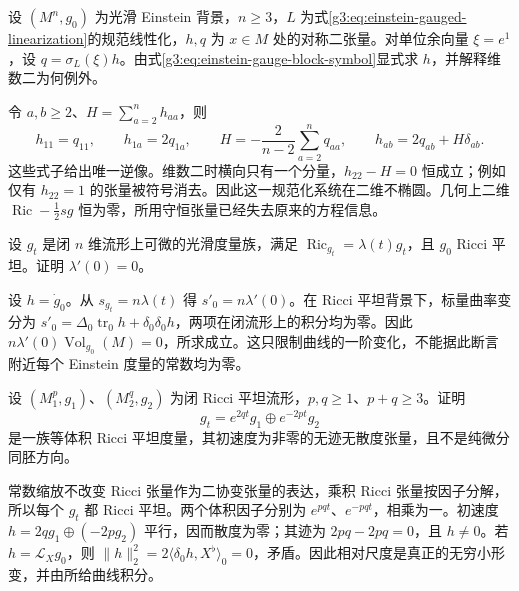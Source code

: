 \begin{exercise}\label{g3:ex:einstein-symbol-inverse}
	设 \((M^n,g_0)\) 为光滑 Einstein 背景，\(n\ge3\)，\(L\) 为式\eqref{g3:eq:einstein-gauged-linearization}的规范线性化，\(h,q\) 为 \(x\in M\) 处的对称二张量。对单位余向量 \(\xi=e^1\)，设 \(q=\sigma_L(\xi)h\)。由式\eqref{g3:eq:einstein-gauge-block-symbol}显式求 \(h\)，并解释维数二为何例外。
\end{exercise}
\begin{solution}
	令 \(a,b\ge2\)、\(H=\sum_{a=2}^nh_{aa}\)，则
	\[
		h_{11}=q_{11},\qquad h_{1a}=2q_{1a},\qquad
		H=-\frac{2}{n-2}\sum_{a=2}^nq_{aa},\qquad
		h_{ab}=2q_{ab}+H\delta_{ab}.
	\]
	这些式子给出唯一逆像。维数二时横向只有一个分量，\(h_{22}-H=0\) 恒成立；例如仅有 \(h_{22}=1\) 的张量被符号消去。因此这一规范化系统在二维不椭圆。几何上二维 \(\operatorname{Ric}-\tfrac12sg\) 恒为零，所用守恒张量已经失去原来的方程信息。
\end{solution}

\begin{exercise}\label{g3:ex:einstein-ricci-flat-variable-constant}
	设 \(g_t\) 是闭 \(n\) 维流形上可微的光滑度量族，满足 \(\operatorname{Ric}_{g_t}=\lambda(t)g_t\)，且 \(g_0\) Ricci 平坦。证明 \(\lambda'(0)=0\)。
\end{exercise}
\begin{solution}
	设 \(h=\dot g_0\)。从 \(s_{g_t}=n\lambda(t)\) 得 \(s'_0=n\lambda'(0)\)。在 Ricci 平坦背景下，标量曲率变分为 \(s'_0=\Delta_0\operatorname{tr}_0h+\delta_0\delta_0h\)，两项在闭流形上的积分均为零。因此 \(n\lambda'(0)\operatorname{Vol}_{g_0}(M)=0\)，所求成立。这只限制曲线的一阶变化，不能据此断言附近每个 Einstein 度量的常数均为零。
\end{solution}

\begin{exercise}\label{g3:ex:einstein-ricci-flat-product-shape}
	设 \((M_1^p,g_1)\)、\((M_2^q,g_2)\) 为闭 Ricci 平坦流形，\(p,q\ge1\)、\(p+q\ge3\)。证明
	\[
		g_t=e^{2qt}g_1\oplus e^{-2pt}g_2
	\]
	是一族等体积 Ricci 平坦度量，其初速度为非零的无迹无散度张量，且不是纯微分同胚方向。
\end{exercise}
\begin{solution}
	常数缩放不改变 Ricci 张量作为二协变张量的表达，乘积 Ricci 张量按因子分解，所以每个 \(g_t\) 都 Ricci 平坦。两个体积因子分别为 \(e^{pqt}\)、\(e^{-pqt}\)，相乘为一。初速度 \(h=2qg_1\oplus(-2pg_2)\) 平行，因而散度为零；其迹为 \(2pq-2pq=0\)，且 \(h\ne0\)。若 \(h=\mathcal L_Xg_0\)，则 \(\|h\|_2^2=2\langle\delta_0h,X^\flat\rangle_0=0\)，矛盾。因此相对尺度是真正的无穷小形变，并由所给曲线积分。
\end{solution}

